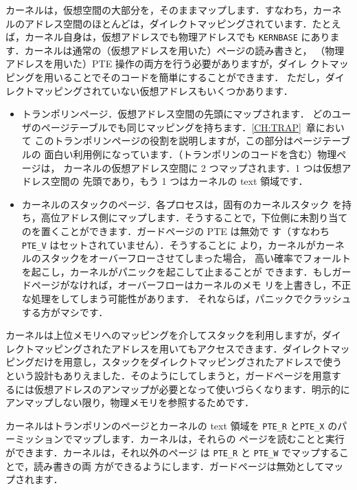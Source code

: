 カーネルは，仮想空間の大部分を，そのままマップします．すなわち，カーネ
ルのアドレス空間のほとんどは，ダイレクトマッピングされています．たとえ
ば，カーネル自身は，仮想アドレスでも物理アドレスでも \lstinline{KERNBASE}
にあります．カーネルは通常の（仮想アドレスを用いた）ページの読み書きと，
（物理アドレスを用いた）PTE 操作の両方を行う必要がありますが，ダイレ
クトマッピングを用いることでそのコードを簡単にすることができます．
ただし，ダイレクトマッピングされていない仮想アドレスもいくつかあります．


\begin{itemize}
  
\item トランポリンページ．仮想アドレス空間の先頭にマップされます．
  どのユーザのページテーブルでも同じマッピングを持ちます．\ref{CH:TRAP}~章において
  このトランポリンページの役割を説明しますが，この部分はページテーブルの
  面白い利用例になっています．（トランポリンのコードを含む）物理ページは，
  カーネルの仮想アドレス空間に 2 つマップされます．1 つは仮想アドレス空間の
  先頭であり，もう 1 つはカーネルの text 領域です．

\item カーネルのスタックのページ．各プロセスは，固有のカーネルスタック
  を持ち，高位アドレス側にマップします．そうすることで，下位側に未割り当て
  のを置くことができます．ガードページの PTE は無効で
  す（すなわち \lstinline{PTE_V} はセットされていません）．そうすることに
  より，カーネルがカーネルのスタックをオーバーフローさせてしまった場合，
  高い確率でフォールトを起こし，カーネルがパニックを起こして止まることが
  できます．もしガードページがなければ，オーバーフローはカーネルのメモ
  リを上書きし，不正な処理をしてしまう可能性があります．
  それならば，パニックでクラッシュする方がマシです．

\end{itemize}

カーネルは上位メモリへのマッピングを介してスタックを利用しますが，ダイ
レクトマッピングされたアドレスを用いてもアクセスできます．ダイレクトマッ
ピングだけを用意し，スタックをダイレクトマッピングされたアドレスで使う
という設計もありえました．そのようにしてしまうと，ガードページを用意す
るには仮想アドレスのアンマップが必要となって使いづらくなります．明示的に
アンマップしない限り，物理メモリを参照するためです．

カーネルはトランポリンのページとカーネルの text 領域を \lstinline{PTE_R}
と\lstinline{PTE_X} のパーミッションでマップします．カーネルは，それらの
ページを読むことと実行ができます．カーネルは，それ以外のページ
は \lstinline{PTE_R} と \lstinline{PTE_W} でマップすることで，読み書きの両
方ができるようにします．ガードページは無効としてマップされます．


